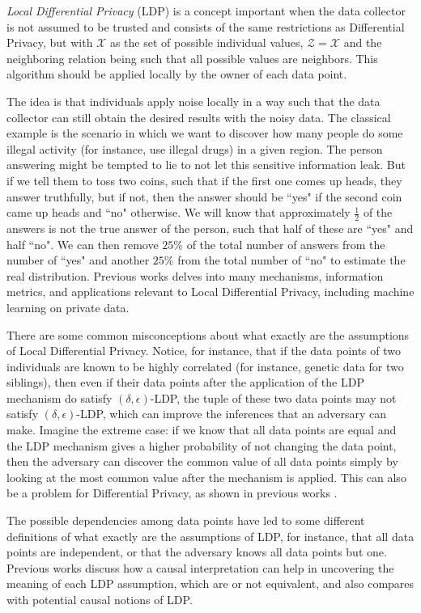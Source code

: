 \documentclass[conference]{IEEEtran}
\newcommand{\qm}[1]{``#1"}
\begin{document}
\emph{Local Differential Privacy} (LDP) is a concept important when the data collector is not assumed to be trusted and consists of the same restrictions as Differential Privacy, but with $\mathcal{X}$ as the set of possible individual values, $\mathcal{Z}=\mathcal{X}$ and the neighboring relation being such that all possible values are neighbors. This algorithm should be applied locally by the owner of each data point.

The idea is that individuals apply noise locally in a way such that the data collector can still obtain the desired results with the noisy data. The classical example is the scenario in which we want to discover how many people do some illegal activity (for instance, use illegal drugs) in a given region. The person answering might be tempted to lie to not let this sensitive information leak. But if we tell them to toss two coins, such that if the first one comes up heads, they answer truthfully, but if not, then the answer should be \qm{yes} if the second coin came up heads and \qm{no} otherwise. We will know that approximately $\frac{1}{2}$ of the answers is not the true answer of the person, such that half of these are \qm{yes} and half \qm{no}. We can then remove $25\%$ of the total number of answers from the number of \qm{yes} and another $25\%$ from the total number of \qm{no} to estimate the real distribution. Previous works \cite{xiong2020comprehensive} delves into many mechanisms, information metrics, and applications relevant to Local Differential Privacy, including machine learning on private data.

There are some common misconceptions about what exactly are the assumptions of Local Differential Privacy. Notice, for instance, that if the data points of two individuals are known to be highly correlated (for instance, genetic data for two siblings), then even if their data points after the application of the LDP mechanism do satisfy $(\delta,\epsilon)$-LDP, the tuple of these two data points may not satisfy $(\delta,\epsilon)$-LDP, which can improve the inferences that an adversary can make. Imagine the extreme case: if we know that all data points are equal and the LDP mechanism gives a higher probability of not changing the data point, then the adversary can discover the common value of all data points simply by looking at the most common value after the mechanism is applied. This can also be a problem for Differential Privacy, as shown in previous works \cite{liu2016dependence}. 

The possible dependencies among data points have led to some different definitions of what exactly are the assumptions of LDP, for instance, that all data points are independent, or that the adversary knows all data points but one. Previous works \cite{tschantz2020sok} discuss how a causal interpretation can help in uncovering the meaning of each LDP assumption, which are or not equivalent, and also compares with potential causal notions of LDP.
\end{document}
